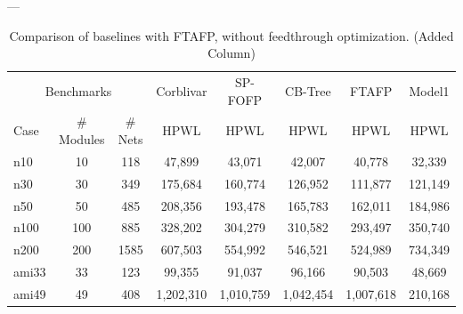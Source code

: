 \documentclass[conference]{IEEEtran}
\begin{document}
---
\begin{table}[htbp] %
    \centering %
    \caption{Comparison of baselines with FTAFP, without feedthrough optimization. (Added Column)} %
    \label{tab:comparison_ftafp_added_col} %
    \small %
    \setlength{\tabcolsep}{4pt} %

    \begin{tabular}{l|cc|c|c|c|c|c} %
        \toprule
        \multicolumn{3}{c|}{Benchmarks} & \multicolumn{1}{c|}{Corblivar \cite{6743101}} & \multicolumn{1}{c|}{SP-FOFP \cite{XU2016150}} & \multicolumn{1}{c|}{CB-Tree \cite{6118158}} & \multicolumn{1}{c|}{FTAFP \cite{10.1145/3658617.3697728}} & \multicolumn{1}{c}{Model1} \\ %
        \cmidrule(lr){1-3} \cmidrule(lr){4-4} \cmidrule(lr){5-5} \cmidrule(lr){6-6} \cmidrule(lr){7-7} \cmidrule(lr){8-8} %
        Case & \# Modules & \# Nets & HPWL & HPWL & HPWL & HPWL & HPWL \\ %
        \midrule
        n10  & 10  & 118 & 47,899  & 43,071  & 42,007  & 40,778 & 32,339 \\ %
        n30  & 30  & 349 & 175,684 & 160,774 & 126,952 & 111,877 & 121,149 \\ %
        n50  & 50  & 485 & 208,356 & 193,478 & 165,783 & 162,011 & 184,986 \\ %
        n100 & 100 & 885 & 328,202 & 304,279 & 310,582 & 293,497 & 350,740 \\ %
        n200 & 200 & 1585& 607,503 & 554,992 & 546,521 & 524,989 & 734,349 \\ %
        ami33& 33  & 123 & 99,355  & 91,037  & 96,166  & 90,503  & 48,669 \\ %
        ami49& 49  & 408 & 1,202,310 & 1,010,759 & 1,042,454 & 1,007,618 & 210,168 \\ %
        \midrule
        \bottomrule
    \end{tabular}
\end{table}
\end{document}

